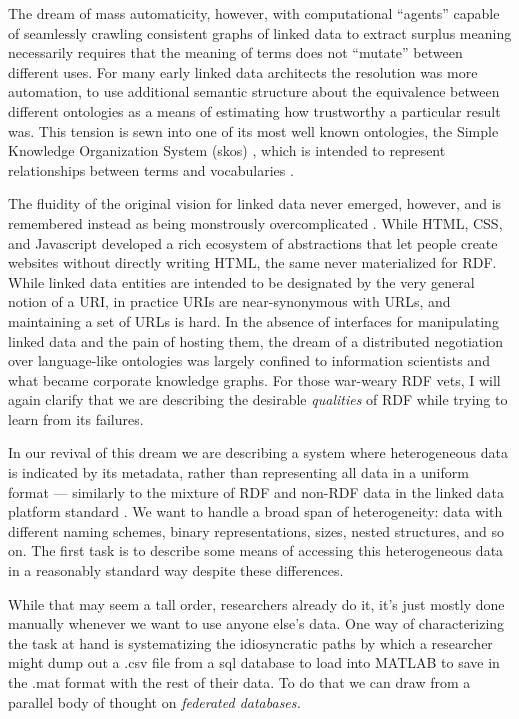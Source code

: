 The dream of mass automaticity, however, with computational ``agents''
capable of seamlessly crawling consistent graphs of linked data to
extract surplus meaning necessarily requires that the meaning of terms
does not ``mutate'' between different uses. For many early linked data
architects the resolution was more automation, to use additional
semantic structure about the equivalence between different ontologies as
a means of estimating how trustworthy a particular result was. This
tension is sewn into one of its most well known ontologies, the Simple
Knowledge Organization System (skos) \citep{brickleySKOSCoreGuide2005} , which is intended to represent relationships between terms and
vocabularies \citep{milesQuickGuidePublishing2005} .

The fluidity of the original vision for linked data never emerged,
however, and is remembered instead as being monstrously overcomplicated
\citep{palmerDitchingSemanticWeb2008, librariaStoningGoliath2022} .
While HTML, CSS, and Javascript developed a rich ecosystem of
abstractions that let people create websites without directly writing
HTML, the same never materialized for RDF. While linked data entities
are intended to be designated by the very general notion of a URI, in
practice URIs are near-synonymous with URLs, and maintaining a set of
URLs is hard. In the absence of interfaces for manipulating linked data
and the pain of hosting them, the dream of a distributed negotiation
over language-like ontologies was largely confined to information
scientists and what became corporate knowledge graphs. For those
war-weary RDF vets, I will again clarify that we are describing the
desirable \emph{qualities} of RDF while trying to learn from its
failures.

In our revival of this dream we are describing a system where
heterogeneous data is indicated by its metadata, rather than
representing all data in a uniform format --- similarly to the mixture
of RDF and non-RDF data in the linked data platform standard \citep{speicherLinkedDataPlatform2015} . We want to handle a broad span of
heterogeneity: data with different naming schemes, binary
representations, sizes, nested structures, and so on. The first task is
to describe some means of accessing this heterogeneous data in a
reasonably standard way despite these differences.

While that may seem a tall order, researchers already do it, it's just
mostly done manually whenever we want to use anyone else's data. One way
of characterizing the task at hand is systematizing the idiosyncratic
paths by which a researcher might dump out a .csv file from a sql
database to load into MATLAB to save in the .mat format with the rest of
their data. To do that we can draw from a parallel body of thought on
\emph{federated databases.}


